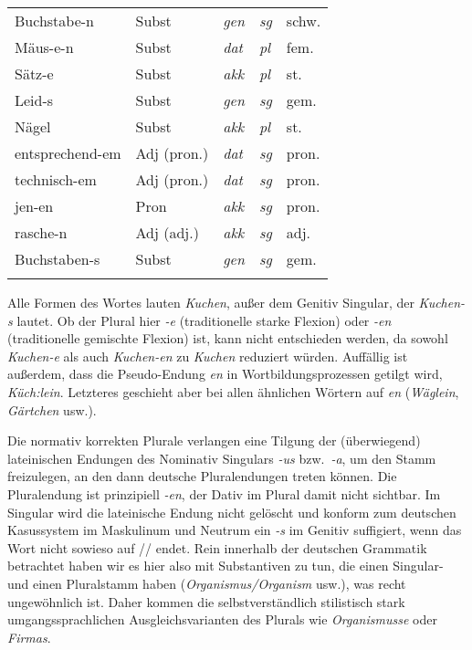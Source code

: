 \begin{center}
\begin{tabular}{lllll}
    Buchstabe-n & Subst & \textit{gen} & \textit{sg} & schw. \\
    Mäus-e-n & Subst & \textit{dat} & \textit{pl} & fem. \\
    Sätz-e & Subst & \textit{akk} & \textit{pl} & st. \\
    Leid-s & Subst & \textit{gen} & \textit{sg} & gem. \\
    Nägel & Subst & \textit{akk} & \textit{pl} & st. \\
    entsprechend-em & Adj (pron.) & \textit{dat} & \textit{sg} & pron. \\
    technisch-em & Adj (pron.) & \textit{dat} & \textit{sg} & pron. \\
    jen-en & Pron & \textit{akk} & \textit{sg} & pron. \\
    rasche-n & Adj (adj.) & \textit{akk} & \textit{sg} & adj. \\
    Buchstaben-s & Subst & \textit{gen} & \textit{sg} & gem. \\
    \lspbottomrule
  \end{tabular}
\end{center}

\label{sol:nominalflexion02}

\begin{sloppypar}
Alle Formen des Wortes lauten \textit{Kuchen}, außer dem Genitiv Singular, der \textit{Kuchen-s} lautet.
Ob der Plural hier \textit{-e} (traditionelle starke Flexion) oder \textit{-en} (traditionelle gemischte Flexion) ist, kann nicht entschieden werden, da sowohl \textit{\Ast Kuchen-e} als auch \textit{\Ast Kuchen-en} zu \textit{Kuchen} reduziert würden.
Auffällig ist außerdem, dass die Pseudo-Endung \textit{en} in Wortbildungsprozessen getilgt wird, \zB \textit{Küch:}\textit{lein}.
Letzteres geschieht aber bei allen ähnlichen Wörtern auf \textit{en} (\textit{Wäglein}, \textit{Gärtchen} usw.).
\end{sloppypar}

\label{sol:nominalflexion03}

Die normativ korrekten Plurale verlangen eine Tilgung der (überwiegend) lateinischen Endungen des Nominativ Singulars \textit{-us} bzw.\ \textit{-a}, um den Stamm freizulegen, an den dann deutsche Pluralendungen treten können.
Die Pluralendung ist prinzipiell \textit{-en}, der Dativ im Plural damit nicht sichtbar.
Im Singular wird die lateinische Endung nicht gelöscht und konform zum deutschen Kasussystem im Maskulinum und Neutrum ein \textit{-s} im Genitiv suffigiert, wenn das Wort nicht sowieso auf // endet.
Rein innerhalb der deutschen Grammatik betrachtet haben wir es hier also mit Substantiven zu tun, die einen Singular- und einen Pluralstamm haben (\textit{Organismus\slash Organism} usw.), was recht ungewöhnlich ist.
Daher kommen die selbstverständlich stilistisch stark umgangssprachlichen Ausgleichsvarianten des Plurals wie \textit{Organismusse} oder \textit{Firmas}.

